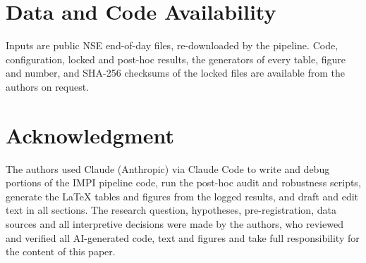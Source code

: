 \documentclass[conference]{IEEEtran}
\begin{document}
\section*{Data and Code Availability}
Inputs are public NSE end-of-day files, re-downloaded by the pipeline. Code, configuration, locked and
post-hoc results, the generators of every table, figure and number, and SHA-256 checksums of the locked files
are available from the authors on request.

\section*{Acknowledgment}
The authors used Claude (Anthropic) via Claude Code to write and debug portions of the IMPI pipeline code,
run the post-hoc audit and robustness scripts, generate the \LaTeX{} tables and figures from the logged
results, and draft and edit text in all sections. The research question, hypotheses, pre-registration, data
sources and all interpretive decisions were made by the authors, who reviewed and verified all AI-generated
code, text and figures and take full responsibility for the content of this paper.

\FloatBarrier


\end{document}
